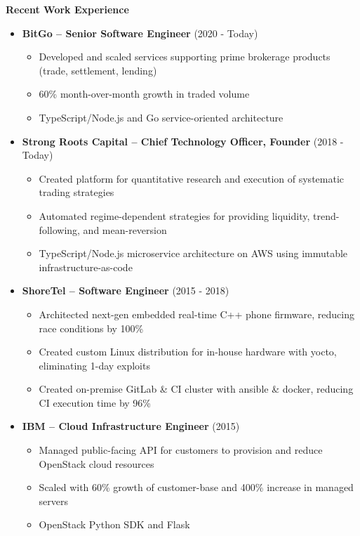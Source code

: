 \documentclass{report}
\begin{document}
\textbf{Recent Work Experience}
\begin{itemize}[label=$\cdot$]

\item \textbf{BitGo -- Senior Software Engineer} (2020 - Today)
  \begin{itemize}[label=$\circ$]
  \item Developed and scaled services supporting prime brokerage products (trade, settlement, lending)
  \item 60\% month-over-month growth in traded volume
  \item TypeScript/Node.js and Go service-oriented architecture
  \end{itemize}

\item \textbf{Strong Roots Capital -- Chief Technology Officer, Founder} (2018 - Today)
  \begin{itemize}[label=$\circ$]
  \item Created platform for quantitative research and execution of systematic trading strategies
  \item Automated regime-dependent strategies for providing liquidity, trend-following, and mean-reversion
  \item TypeScript/Node.js microservice architecture on AWS using immutable infrastructure-as-code
  \end{itemize}

\item \textbf{ShoreTel -- Software Engineer} (2015 - 2018)
  \begin{itemize}[label=$\circ$]
  \item Architected next-gen embedded real-time C++ phone firmware, reducing race conditions by 100\%
  \item Created custom Linux distribution for in-house hardware with yocto, eliminating 1-day exploits
  \item Created on-premise GitLab \& CI cluster with ansible \& docker, reducing CI execution time by 96\%
  \end{itemize}

\item \textbf{IBM -- Cloud Infrastructure Engineer} (2015)
  \begin{itemize}[label=$\circ$]
  \item Managed public-facing API for customers to provision and reduce OpenStack cloud resources
  \item Scaled with 60\% growth of customer-base and 400\% increase in managed servers
  \item OpenStack Python SDK and Flask
  \end{itemize}


\end{itemize}
\end{document}

